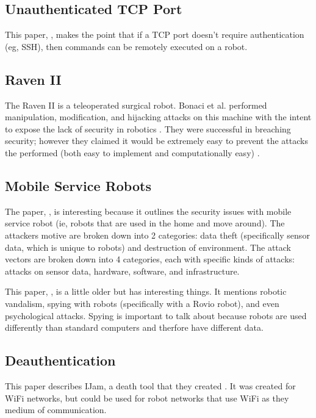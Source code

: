 \subsection{Unauthenticated TCP Port}
This paper, \cite{Miller:2018}, makes the point that if a TCP port doesn't require authentication (eg, SSH), then commands can be remotely executed on a robot.


\subsection{Raven II}
The Raven II is a teleoperated surgical robot. Bonaci et al. performed manipulation, modification, and hijacking attacks on this machine with the intent to expose the lack of security in robotics \cite{BonaciHYYKC15}. They were successful in breaching security; however they claimed it would be extremely easy to prevent the attacks the performed (both easy to implement and computationally easy) \cite{BonaciHYYKC15}.

\subsection{Mobile Service Robots}
The paper, \cite{Cornelius}, is interesting because it outlines the security issues with mobile service robot (ie, robots that are used in the home and move around). The attackers motive are broken down into 2 categories: data theft (specifically sensor data, which is unique to robots) and destruction of environment. The attack vectors are broken down into 4 categories, each with specific kinds of attacks: attacks on sensor data, hardware, software, and infrastructure. 

This paper, \cite{Denning:2009}, is a little older but has interesting things. It mentions robotic vandalism, spying with robots (specifically with a Rovio robot), and even psychological attacks. Spying is important to talk about because robots are used differently than standard computers and therfore have different data.

\subsection{Deauthentication}
This paper describes IJam, a death tool that they created \cite{Al-Ani:2017}. It was created for WiFi networks, but could be used for robot networks that use WiFi as they medium of communication.

